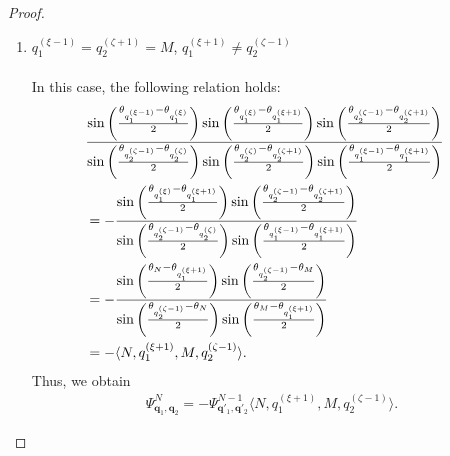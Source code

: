 \documentclass[10pt,a4paper]{amsart}
\begin{document}
\begin{proof}
\begin{enumerate}
\item[\textit{Case.4:}] ${q_1^{(\xi-1)}} = {q_2^{(\zeta+1)}} = M$, ${q_1^{(\xi+1)}} \ne {q_2^{(\zeta-1)}}$\\ \\
In this case, the following relation holds:
\begin{align}
    &\frac{\sin\left( \frac{\theta_{q_1^{(\xi-1)}} - \theta_{q_1^{(\xi)}}}{2} \right)\sin\left( \frac{\theta_{q_1^{(\xi)}} - \theta_{q_1^{(\xi+1)}}}{2} \right)\sin\left( \frac{\theta_{q_2^{(\zeta-1)}} - \theta_{q_2^{(\zeta+1)}}}{2} \right)}
   {\sin\left( \frac{\theta_{q_2^{(\zeta-1)}} - \theta_{q_2^{(\zeta)}}}{2} \right)\sin\left( \frac{\theta_{q_2^{(\zeta)}} - \theta_{q_2^{(\zeta+1)}}}{2} \right)\sin\left( \frac{\theta_{q_1^{(\xi-1)}} - \theta_{q_1^{(\xi+1)}}}{2} \right)}\cr
    &=-\frac{\sin\left( \frac{\theta_{q_1^{(\xi)}} - \theta_{q_1^{(\xi+1)}}}{2} \right)\sin\left( \frac{\theta_{q_2^{(\zeta-1)}} - \theta_{q_2^{(\zeta+1)}}}{2} \right)}
   {\sin\left( \frac{\theta_{q_2^{(\zeta-1)}} - \theta_{q_2^{(\zeta)}}}{2} \right)\sin\left( \frac{\theta_{q_1^{(\xi-1)}} - \theta_{q_1^{(\xi+1)}}}{2} \right)}\cr
    &=-\frac{\sin\left( \frac{\theta_{N} - \theta_{q_1^{(\xi+1)}}}{2} \right)\sin\left( \frac{\theta_{q_2^{(\zeta-1)}} - \theta_{M}}{2} \right)}
   {\sin\left( \frac{\theta_{q_2^{(\zeta-1)}} - \theta_{N}}{2} \right)\sin\left( \frac{\theta_{M} - \theta_{q_1^{(\xi+1)}}}{2} \right)}\cr
    &= -\langle N,q_1^{(\xi+1)},M, q_2^{(\zeta-1)}\rangle.
\end{align}
Thus, we obtain
\begin{align}
    \Psi^N_{\bm{q}_1, \bm{q}_2} = -\Psi^{N-1}_{\bm{q}'_1, \bm{q}'_2}\langle N,q_1^{(\xi+1)},M, q_2^{(\zeta-1)}\rangle.
\end{align}


\end{enumerate}
\end{proof}
\end{document}
